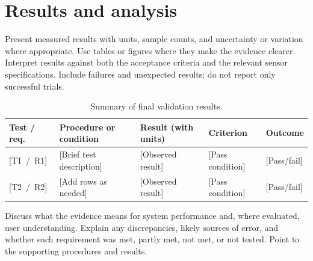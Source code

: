 \chapter{Results and analysis}
\label{sec:results}

Present measured results with units, sample counts, and uncertainty or
variation where appropriate. Use tables or figures where they make the
evidence clearer. Interpret results against both the acceptance criteria and
the relevant sensor specifications. Include failures and unexpected results;
do not report only successful trials.

\begin{table}[htbp]
  \centering
  \caption{Summary of final validation results.}
  \label{tab:results}
  \begin{tabularx}{\linewidth}{lYYYY}
    \toprule
    Test / req. & Procedure or condition & Result (with units) &
    Criterion & Outcome \\
    \midrule
    \mbox{[T1 / R1]} & [Brief test description] &
    [Observed result] & [Pass condition] & [Pass/fail] \\
    \mbox{[T2 / R2]} & [Add rows as needed] &
    [Observed result] & [Pass condition] & [Pass/fail] \\
    \bottomrule
  \end{tabularx}
\end{table}

Discuss what the evidence means for system performance and, where evaluated,
user understanding.
Explain any discrepancies, likely sources of error, and whether each
requirement was met, partly met, not met, or not tested. Point to the
supporting procedures and results.
